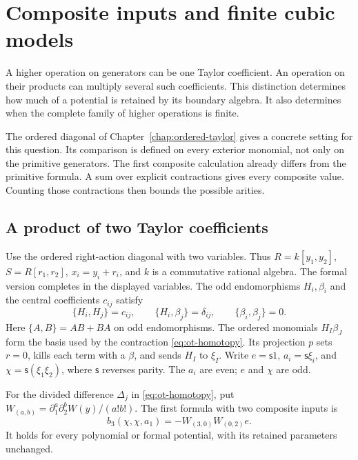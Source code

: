 \chapter{Composite inputs and finite cubic models}
\label{chap:composite-operations}

A higher operation on generators can be one Taylor coefficient.
An operation on their products can multiply several such coefficients.
This distinction determines how much of a potential is retained by
its boundary algebra. It also determines when the complete family
of higher operations is finite.

The ordered diagonal of Chapter~\ref{chap:ordered-taylor} gives a
concrete setting for this question. Its comparison is defined on
every exterior monomial, not only on the primitive generators.
The first composite calculation already differs from the primitive
formula. A sum over explicit contractions gives every composite
value. Counting those contractions then bounds the possible arities.

\section{A product of two Taylor coefficients}
\label{sec:co-composite-example}

Use the ordered right-action diagonal with two variables. Thus
\(R=k[y_1,y_2]\), \(S=R[r_1,r_2]\), \(x_i=y_i+r_i\), and
\(k\) is a commutative rational algebra. The formal version completes
in the displayed variables. The odd endomorphisms \(H_i,\beta_i\)
and the central coefficients \(c_{ij}\) satisfy
\[
 \{H_i,H_j\}=c_{ij},\qquad
 \{H_i,\beta_j\}=\delta_{ij},\qquad
 \{\beta_i,\beta_j\}=0.
\]
Here \(\{A,B\}=AB+BA\) on odd endomorphisms. The ordered monomials
\(H_I\beta_J\) form the basis used by the contraction
\eqref{eq:ot-homotopy}. Its projection \(p\) sets \(r=0\), kills
each term with a \(\beta\), and sends \(H_I\) to \(\xi_I\).
Write \(e=\mathsf{s}1\), \(a_i=\mathsf{s}\xi_i\), and
\(\chi=\mathsf{s}(\xi_1\xi_2)\), where \(\mathsf{s}\) reverses parity.
The \(a_i\) are even; \(e\) and \(\chi\) are odd.

For the divided difference \(\Delta_j\) in \eqref{eq:ot-homotopy},
put \(W_{(a,b)}=\partial_1^a\partial_2^bW(y)/(a!b!)\).
The first formula with two composite inputs is
\begin{equation}\label{eq:co-first-composite}
 b_3(\chi,\chi,a_1)=-W_{(3,0)}W_{(0,2)}e.
\end{equation}
It holds for every polynomial or formal potential, with its
retained parameters unchanged.


